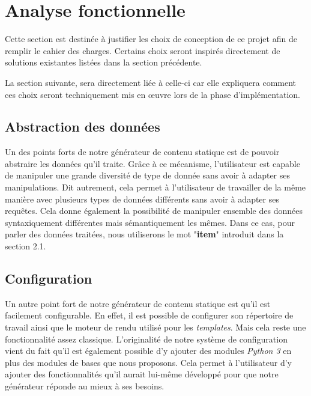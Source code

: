\section{Analyse fonctionnelle}

	Cette section est destinée à justifier les choix de conception de ce projet afin de remplir le cahier des charges. Certains choix seront inspirés directement de solutions existantes listées dans la section précédente.
	
	La section suivante, sera directement liée à celle-ci car elle expliquera comment ces choix seront techniquement mis en œuvre lors de la phase d'implémentation.
	
	\subsection{Abstraction des données}
		Un des points forts de notre générateur de contenu statique est de pouvoir abstraire les données qu'il traite. Grâce à ce mécanisme, l'utilisateur est capable de manipuler une grande diversité de type de donnée sans avoir à adapter ses manipulations. Dit autrement, cela permet à l'utilisateur de travailler de la même manière avec plusieurs types de données différents sans avoir à adapter ses requêtes. Cela donne également la possibilité de manipuler ensemble des données  syntaxiquement différentes mais sémantiquement les mêmes. Dans ce cas, pour parler des données traitées, nous utiliserons le mot "\textbf{item}" introduit dans la section 2.1.
		
	\subsection{Configuration}
		Un autre point fort de notre générateur de contenu statique est qu'il est facilement configurable. En effet, il est possible de configurer son répertoire de travail ainsi que le moteur de rendu utilisé pour les \textit{templates}. Mais cela reste une fonctionnalité assez classique. L'originalité de notre système de configuration vient du fait qu'il est également possible d'y ajouter des modules \textit{Python 3} en plus des modules de bases que nous proposons. Cela permet à l'utilisateur d'y ajouter des fonctionnalités qu'il aurait lui-même développé pour que notre générateur réponde au mieux à ses besoins.
		


